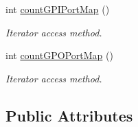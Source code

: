 \begin{DoxyCompactItemize}
int \hyperlink{class_e_l_f_i_n_1_1_stub_reader_a10dbe74ea4b6c65c8985360919701b73}{count\-G\-P\-I\-Port\-Map} ()
\begin{DoxyCompactList}\small\item\em Iterator access method. \end{DoxyCompactList}\item 
int \hyperlink{class_e_l_f_i_n_1_1_stub_reader_a8c3f4692a15a37c6476480b851b722bc}{count\-G\-P\-O\-Port\-Map} ()
\begin{DoxyCompactList}\small\item\em Iterator access method. \end{DoxyCompactList}\end{DoxyCompactItemize}

\subsection*{Public Attributes}
